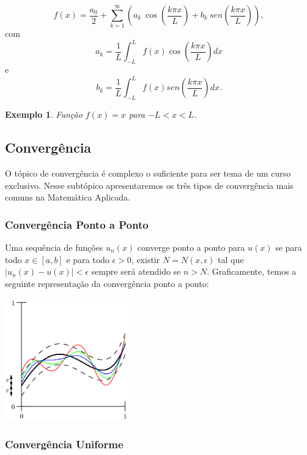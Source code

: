 \documentclass[a4paper,portuguese,9pt,final]{extarticle}
\newtheorem{example}{Exemplo}[section]
\providecommand{\sin}{} \renewcommand{\sin}{sen}
\begin{document}
\begin{multicols*}{2}
        \begin{equation}	
            f(x) = \frac{a_{0}}{2}+\sum_{k=1}^{\infty}(a_{k} \  \cos(\frac{k\pi x}{L}) + b_{k}\ sen(\frac{k\pi x}{L})),
        \end{equation}
        com 
        $$a_{k} = \frac{1}{L} \int_{-L}^{L}f(x) \cos(\frac{k \pi x}{L})dx$$ e
        $$b_{k} = \frac{1}{L} \int_{-L}^{L}f(x) \sin(\frac{k \pi x}{L})dx.$$
                
        \begin{example}	
            Função $f(x)=x$ para $-L<x<L$.
        \end{example}

        \subsection{Convergência}

            O tópico de convergência é complexo o suficiente para ser tema de um curso exclusivo. Nesse subtópico apresentaremos os três tipos de convergência mais comuns na Matemática Aplicada.

            \subsubsection{Convergência Ponto a Ponto}

                Uma sequência de funções $u_n (x)$ converge ponto a ponto para $u(x)$ se para todo $x \in [a,b]$ e para todo $\epsilon >0$, existir $N=N(x,\epsilon)$ tal que $|u_n (x) - u(x)| < \epsilon$ sempre será atendido se $n>N$. Graficamente, temos a seguinte representação da convergência ponto a ponto:

                \includegraphics[width=0.4\textwidth]{pointwise}

            \subsubsection{Convergência Uniforme}


\end{multicols*}
\end{document}
